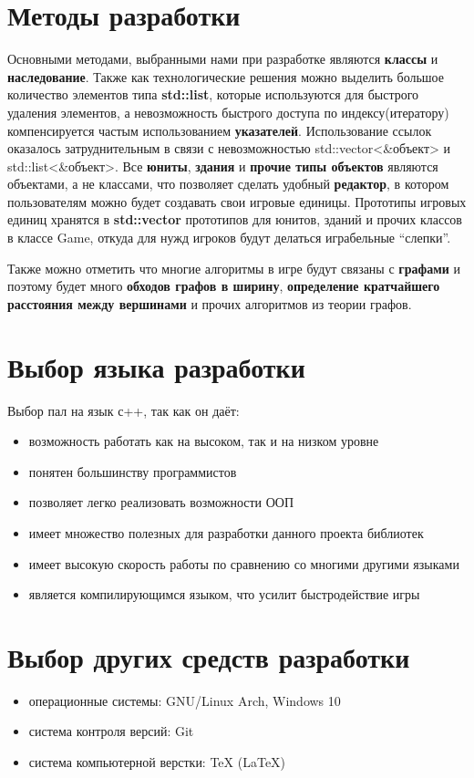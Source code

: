 \documentclass[a4paper,12pt,fleqn]{article} %
\begin{document}
\section{Методы разработки}
Основными методами, выбранными нами при разработке являются \textbf{классы} и \textbf{наследование}.
Также как технологические решения можно выделить большое количество элементов типа \textbf{std::list},
 которые используются для быстрого удаления элементов,
 а невозможность быстрого доступа по индексу(итератору) компенсируется частым использованием \textbf{указателей}.
 Использование ссылок оказалось затруднительным в связи с невозможностью std::vector<\&объект> и std::list<\&объект>.
 Все \textbf{юниты}, \textbf{здания} и \textbf{прочие типы объектов} являются объектами, а не классами,
 что позволяет сделать удобный \textbf{редактор}, в котором пользователям можно будет создавать свои игровые единицы. 
Прототипы игровых единиц хранятся в \textbf{std::vector} прототипов для юнитов,
 зданий и прочих классов в классе Game, откуда для нужд игроков будут делаться играбельные ``слепки''.

Также можно отметить что многие алгоритмы в игре будут связаны с \textbf{графами} и поэтому
 будет много \textbf{обходов графов в ширину}, \textbf{определение кратчайшего расстояния между вершинами}
 и прочих алгоритмов из теории графов.

\newpage
\section{Выбор языка разработки}
Выбор пал на язык с++, так как он даёт:
\begin{itemize}
    \item возможность работать как на высоком, так и на низком уровне
    \item понятен большинству программистов
    \item позволяет легко реализовать возможности ООП
    \item имеет множество полезных для разработки данного проекта библиотек
    \item имеет высокую скорость работы по сравнению со многими другими языками
    \item является компилирующимся языком, что усилит быстродействие игры
\end{itemize}

\newpage
\section{Выбор других средств разработки}
\begin{itemize}
    \item операционные системы: GNU/Linux Arch, Windows 10
    \item система контроля версий: Git
    \item система компьютерной верстки: TeX (LaTeX)
\end{itemize}
\end{document}

